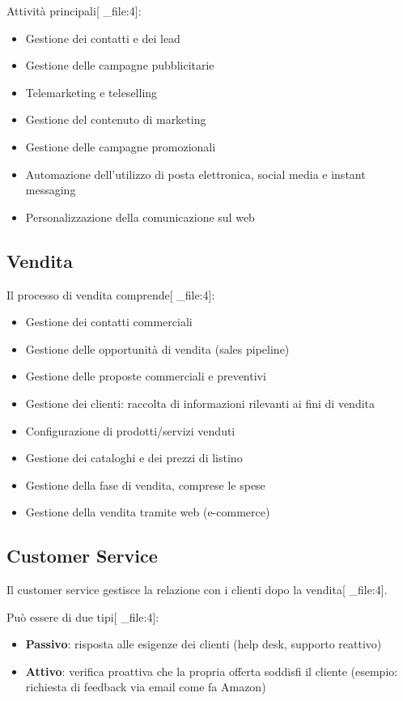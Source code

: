 \documentclass[12pt,a4paper]{article}
\begin{document}
Attività principali[ _file:4]:
\begin{itemize}
    \item Gestione dei contatti e dei lead
    \item Gestione delle campagne pubblicitarie
    \item Telemarketing e teleselling
    \item Gestione del contenuto di marketing
    \item Gestione delle campagne promozionali
    \item Automazione dell'utilizzo di posta elettronica, social media e instant messaging
    \item Personalizzazione della comunicazione sul web
\end{itemize}

\subsection{Vendita}
Il processo di vendita comprende[ _file:4]:

\begin{itemize}
    \item Gestione dei contatti commerciali
    \item Gestione delle opportunità di vendita (sales pipeline)
    \item Gestione delle proposte commerciali e preventivi
    \item Gestione dei clienti: raccolta di informazioni rilevanti ai fini di vendita
    \item Configurazione di prodotti/servizi venduti
    \item Gestione dei cataloghi e dei prezzi di listino
    \item Gestione della fase di vendita, comprese le spese
    \item Gestione della vendita tramite web (e-commerce)
\end{itemize}

\subsection{Customer Service}
Il customer service gestisce la relazione con i clienti dopo la vendita[ _file:4].

Può essere di due tipi[ _file:4]:
\begin{itemize}
    \item \textbf{Passivo}: risposta alle esigenze dei clienti (help desk, supporto reattivo)
    \item \textbf{Attivo}: verifica proattiva che la propria offerta soddisfi il cliente (esempio: richiesta di feedback via email come fa Amazon)
\end{itemize}
\end{document}
